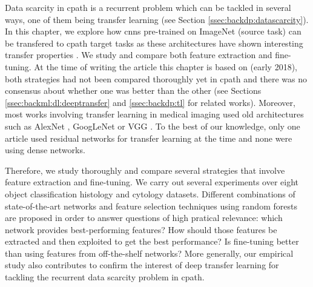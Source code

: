 
Data scarcity in \acrlong{cpath} is a recurrent problem which can be tackled in several ways, one of them being transfer learning (see Section \ref{ssec:backdp:datascarcity}). In this chapter, we explore how \acrlong{cnn}s pre-trained on ImageNet \cite{deng2009imagenet} (source task) can be transfered to \acrlong{cpath} target tasks as these architectures have shown interesting transfer properties \parencite{donahue2014decaf,yosinski2014transferable,sermanet2013overfeat}. We study and compare both feature extraction and fine-tuning. At the time of writing the article this chapter is based on (early 2018), both strategies had not been compared thoroughly yet in \acrlong{cpath} and there was no consensus about whether one was better than the other (see Sections \ref{ssec:backml:dl:deeptransfer} and \ref{ssec:backdp:tl} for related works). Moreover, most works involving transfer learning in medical imaging used old architectures such as AlexNet \parencite{shin2016deep,bayramoglu2016transfer,antony2016quantifying,ravishankar2016understanding,tajbakhsh2016convolutional,kumar2017comparative,kim2016deep}, GoogLeNet \parencite{shin2016deep,bayramoglu2016transfer} or VGG \parencite{kieffer2017convolutional,bayramoglu2016transfer,antony2016quantifying,yu2017deep,hou2016automatic,kumar2017comparative}. To the best of our knowledge, only one article used residual networks for transfer learning at the time \parencite{yu2017deep} and none were using dense networks.

Therefore, we study thoroughly and compare several strategies that involve feature extraction and fine-tuning. We carry out several experiments over eight object classification histology and cytology datasets. Different combinations of state-of-the-art networks and feature selection techniques using random forests are proposed in order to answer questions of high pratical relevance: which network provides best-performing features? How should those features be extracted and then exploited to get the best performance? Is fine-tuning better than using features from off-the-shelf networks? More generally, our empirical study also contributes to confirm the interest of deep transfer learning for tackling the recurrent data scarcity problem in \acrlong{cpath}.

